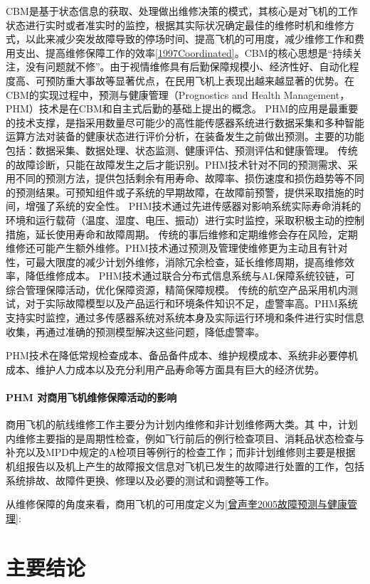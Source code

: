 \documentclass[12pt,a4paper]{report}
\begin{document}
CBM是基于状态信息的获取、处理做出维修决策的模式，其核心是对飞机的工作状态进行实时或者准实时的监控，根据其实际状况确定最佳的维修时机和维修方式，以此来减少突发故障导致的停场时间、提高飞机的可用度，减少维修工作和费用支出、提高维修保障工作的效率\ref{1997Coordinated}。CBM的核心思想是“持续关注，没有问题就不修”。由于视情维修具有后勤保障规模小、经济性好、自动化程度高、可预防重大事故等显著优点，在民用飞机上表现出越来越显著的优势。在CBM的实现过程中，预测与健康管理（Prognostics and Health Management，PHM）技术是在CBM和自主式后勤的基础上提出的概念。 PHM的应用是最重要的技术支撑，是指采用数量尽可能少的高性能传感器系统进行数据采集和多种智能运算方法对装备的健康状态进行评价分析，在装备发生之前做出预测。主要的功能包括：数据采集、数据处理、状态监测、健康评估、预测评估和健康管理。
传统的故障诊断，只能在故障发生之后才能识别。PHM技术针对不同的预测需求、采用不同的预测方法，提供包括剩余有用寿命、故障率、损伤速度和损伤趋势等不同的预测结果。可预知组件或子系统的早期故障，在故障前预警，提供采取措施的时间，增强了系统的安全性。
PHM技术通过先进传感器对影响系统实际寿命消耗的环境和运行载荷（温度、湿度、电压、振动）进行实时监控，采取积极主动的控制措施，延长使用寿命和故障周期。
传统的事后维修和定期维修会存在风险，定期维修还可能产生额外维修。PHM技术通过预测及管理使维修更为主动且有针对性，可最大限度的减少计划外维修，消除冗余检查，延长维修周期，提高维修效率，降低维修成本。
PHM技术通过联合分布式信息系统与AL保障系统铰链，可综合管理保障活动，优化保障资源，精简保障规模。
传统的航空产品采用机内测试，对于实际故障模型以及产品运行和环境条件知识不足，虚警率高。PHM系统支持实时监控，通过多传感器系统对系统本身及实际运行环境和条件进行实时信息收集，再通过准确的预测模型解决这些问题，降低虚警率。

PHM技术在降低常规检查成本、备品备件成本、维护规模成本、系统非必要停机成本、维护人力成本以及充分利用产品寿命等方面具有巨大的经济优势。

\subsubsection{PHM 对商用飞机维修保障活动的影响}

商用飞机的航线维修工作主要分为计划内维修和非计划维修两大类。其
中，计划内维修主要指的是周期性检查，例如飞行前后的例行检查项目、消耗品状态检查与补充以及MPD中规定的A检项目等例行的检查工作；而非计划维修则主要是根据机组报告以及机上产生的故障报文信息对飞机已发生的故障进行处置的工作，包括系统排故、故障件更换、修理以及必要的测试和调整等工作。

从维修保障的角度来看，商用飞机的可用度定义为\ref{曾声奎2005故障预测与健康管理}:



\chapter{主要结论}





\cleardoublepage
\printbibliography[heading=bibintoc,title=参考文献]

\makeatother
\end{document}
